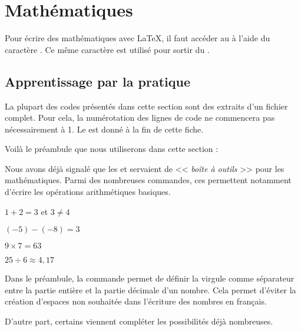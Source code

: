 \documentclass[10pt,french,openright,twoside]{book}
\begin{document}
\chapter{Mathématiques}

\begin{info}
    Pour écrire des mathématiques avec \LaTeX, il faut accéder au  à l'aide du caractère \ordi{\$}. Ce même caractère est utilisé pour sortir du .
\end{info}

\section{Apprentissage par la pratique}

\begin{info}
	La plupart des codes présentés dans cette section sont des extraits d'un fichier complet. Pour cela, la numérotation des lignes de code ne commencera pas nécessairement à 1. Le  est donné à la fin de cette fiche.
\end{info}

Voilà le préambule que nous utiliserons dans cette section :


Nous avons déjà signalé que les \package[s]  et  servaient de << \textit{boîte à outils} >> pour les mathématiques. Parmi des nombreuses commandes, ces \package[s] permettent notamment d'écrire les opérations arithmétiques basiques.\bigskip

{\NewFont
\begin{SideBySideExample}
    $1 + 2 = 3$ et $3 \neq 4$\par
    $(-5) - (-8) = 3$ \par
    $9 \times 7 = 63$\par
    $25 \div 6 \approx 4,17$
\end{SideBySideExample}
}\bigskip

\begin{info}
    Dans le préambule, la commande  permet de définir la virgule comme séparateur entre la partie entière et la partie décimale d'un nombre. Cela permet d'éviter la création d'espaces non souhaitée dans l'écriture des nombres en français.
\end{info}

D'autre part, certains \package[s] viennent compléter les possibilités déjà nombreuses.
\end{document}
